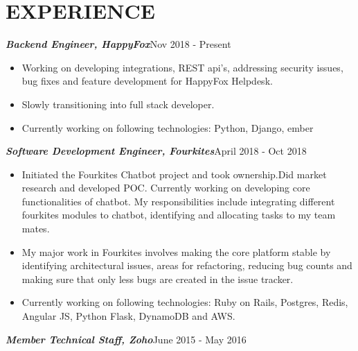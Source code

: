 \documentclass[11pt,a4paper]{article}
\begin{document}
\section*{EXPERIENCE}
\emph{\textbf {Backend Engineer, HappyFox}}{\hfill Nov 2018 - Present}
\begin{itemize}[noitemsep]
\item Working on developing integrations, REST api's, addressing security issues, bug fixes and feature development for HappyFox Helpdesk.
\item Slowly transitioning into full stack developer.
\item Currently working on following technologies: Python, Django, ember
\end{itemize}
\emph{\textbf {Software Development Engineer, Fourkites}}{\hfill April 2018 - Oct 2018}
\begin{itemize}[noitemsep]
\item  Initiated the Fourkites Chatbot project and took ownership.Did market research and developed POC. Currently working on developing core functionalities of chatbot. My responsibilities include integrating different fourkites modules to chatbot, identifying and allocating tasks to my team mates.
\item My major work in Fourkites involves making the core platform stable by identifying architectural issues, areas for refactoring, reducing bug counts and making sure that only less bugs are created in the issue tracker.
\item Currently working on following technologies: Ruby on Rails, Postgres, Redis, Angular JS, Python Flask, DynamoDB and AWS. 
\end{itemize}
\emph{\textbf {Member Technical Staff, Zoho}}{\hfill June 2015 - May 2016}
\end{document}
